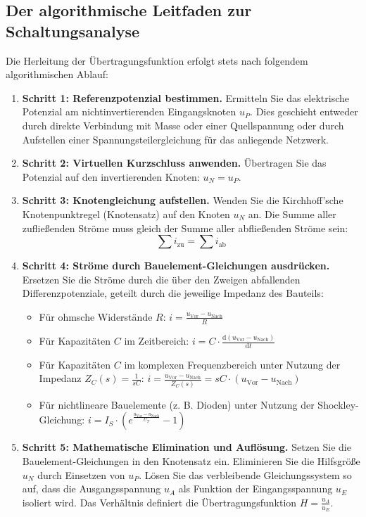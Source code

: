 \documentclass[11pt,a4paper]{article}
\begin{document}
\subsection{Der algorithmische Leitfaden zur Schaltungsanalyse}
Die Herleitung der Übertragungsfunktion erfolgt stets nach folgendem algorithmischen Ablauf:
\begin{enumerate}
    \item \textbf{Schritt 1: Referenzpotenzial bestimmen.} Ermitteln Sie das elektrische Potenzial am nichtinvertierenden Eingangsknoten $u_P$. Dies geschieht entweder durch direkte Verbindung mit Masse oder einer Quellspannung oder durch Aufstellen einer Spannungsteilergleichung für das anliegende Netzwerk.
    \item \textbf{Schritt 2: Virtuellen Kurzschluss anwenden.} Übertragen Sie das Potenzial auf den invertierenden Knoten: $u_N = u_P$.
    \item \textbf{Schritt 3: Knotengleichung aufstellen.} Wenden Sie die Kirchhoff'sche Knotenpunktregel (Knotensatz) auf den Knoten $u_N$ an. Die Summe aller zufließenden Ströme muss gleich der Summe aller abfließenden Ströme sein:
    \begin{equation}
    \sum i_{\text{zu}} = \sum i_{\text{ab}}
    \end{equation}
    \item \textbf{Schritt 4: Ströme durch Bauelement-Gleichungen ausdrücken.} Ersetzen Sie die Ströme durch die über den Zweigen abfallenden Differenzpotenziale, geteilt durch die jeweilige Impedanz des Bauteils:
    \begin{itemize}
        \item Für ohmsche Widerstände $R$: $i = \frac{u_{\text{Vor}} - u_{\text{Nach}}}{R}$
        \item Für Kapazitäten $C$ im Zeitbereich: $i = C \cdot \frac{\text{d}(u_{\text{Vor}} - u_{\text{Nach}})}{\text{d}t}$
        \item Für Kapazitäten $C$ im komplexen Frequenzbereich unter Nutzung der Impedanz $Z_C(s) = \frac{1}{sC}$: $i = \frac{u_{\text{Vor}} - u_{\text{Nach}}}{Z_C(s)} = sC \cdot (u_{\text{Vor}} - u_{\text{Nach}})$
        \item Für nichtlineare Bauelemente (z. B. Dioden) unter Nutzung der Shockley-Gleichung: $i = I_S \cdot \left( e^{\frac{u_{\text{Vor}} - u_{\text{Nach}}}{U_T}} - 1 \right)$
    \end{itemize}
    \item \textbf{Schritt 5: Mathematische Elimination und Auflösung.} Setzen Sie die Bauelement-Gleichungen in den Knotensatz ein. Eliminieren Sie die Hilfsgröße $u_N$ durch Einsetzen von $u_P$. Lösen Sie das verbleibende Gleichungssystem so auf, dass die Ausgangsspannung $u_A$ als Funktion der Eingangsspannung $u_E$ isoliert wird. Das Verhältnis definiert die Übertragungsfunktion $H = \frac{u_A}{u_E}$.
\end{enumerate}
\end{document}
